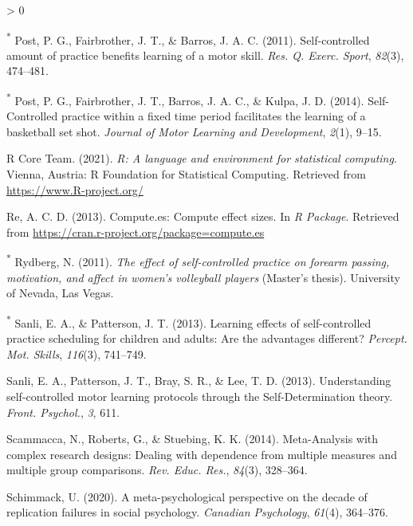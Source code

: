 \documentclass[
  english,
  man,floatsintext]{apa7}
\newlength{\cslhangindent}
\newenvironment{CSLReferences}[2] %
 {%
  \setlength{\parindent}{0pt}
  \ifodd #1 \everypar{\setlength{\hangindent}{\cslhangindent}}\ignorespaces\fi
  \ifnum #2 > 0
  \setlength{\parskip}{#2\baselineskip}
  \fi
 }%
 {}
\begin{document}
\begin{CSLReferences}{1}{0}
\leavevmode\hypertarget{ref-Post2011-qc}{}%
\textsuperscript{*} Post, P. G., Fairbrother, J. T., \& Barros, J. A. C. (2011). Self-controlled amount of practice benefits learning of a motor skill. \emph{Res. Q. Exerc. Sport}, \emph{82}(3), 474--481.

\leavevmode\hypertarget{ref-Post2014-yi}{}%
\textsuperscript{*} Post, P. G., Fairbrother, J. T., Barros, J. A. C., \& Kulpa, J. D. (2014). {Self-Controlled} practice within a fixed time period facilitates the learning of a basketball set shot. \emph{Journal of Motor Learning and Development}, \emph{2}(1), 9--15.

\leavevmode\hypertarget{ref-R-base}{}%
R Core Team. (2021). \emph{R: A language and environment for statistical computing}. Vienna, Austria: R Foundation for Statistical Computing. Retrieved from \url{https://www.R-project.org/}

\leavevmode\hypertarget{ref-R-computees}{}%
Re, A. C. D. (2013). Compute.es: Compute effect sizes. In \emph{R Package}. Retrieved from \url{https://cran.r-project.org/package=compute.es}

\leavevmode\hypertarget{ref-Rydberg2011-zg}{}%
\textsuperscript{*} Rydberg, N. (2011). \emph{The effect of self-controlled practice on forearm passing, motivation, and affect in women's volleyball players} (Master's thesis). University of Nevada, Las Vegas.

\leavevmode\hypertarget{ref-Sanli2013-qh}{}%
\textsuperscript{*} Sanli, E. A., \& Patterson, J. T. (2013). Learning effects of self-controlled practice scheduling for children and adults: Are the advantages different? \emph{Percept. Mot. Skills}, \emph{116}(3), 741--749.

\leavevmode\hypertarget{ref-Sanli2013-xn}{}%
Sanli, E. A., Patterson, J. T., Bray, S. R., \& Lee, T. D. (2013). Understanding self-controlled motor learning protocols through the {Self-Determination} theory. \emph{Front. Psychol.}, \emph{3}, 611.

\leavevmode\hypertarget{ref-Scammacca2014-do}{}%
Scammacca, N., Roberts, G., \& Stuebing, K. K. (2014). {Meta-Analysis} with complex research designs: Dealing with dependence from multiple measures and multiple group comparisons. \emph{Rev. Educ. Res.}, \emph{84}(3), 328--364.

\leavevmode\hypertarget{ref-Schimmack2020-ea}{}%
Schimmack, U. (2020). A meta-psychological perspective on the decade of replication failures in social psychology. \emph{Canadian Psychology}, \emph{61}(4), 364--376.


\end{CSLReferences}
\end{document}
